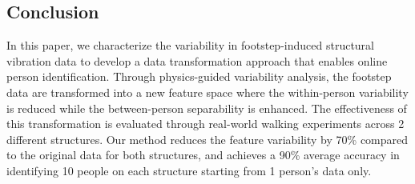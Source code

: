 \documentclass[11pt,letter]{article}
\begin{document}
\begin{multicols*}{2}
\section{Conclusion}
In this paper, we characterize the variability in footstep-induced structural vibration data to develop a data transformation approach that enables online person identification. Through physics-guided variability analysis, the footstep data are transformed into a new feature space where the within-person variability is reduced while the between-person separability is enhanced. The effectiveness of this transformation is evaluated through real-world walking experiments across 2 different structures. Our method reduces the feature variability by 70\% compared to the original data for both structures, and achieves a 90\% average accuracy in identifying 10 people on each structure starting from 1 person’s data only.


\end{multicols*}
\end{document}
